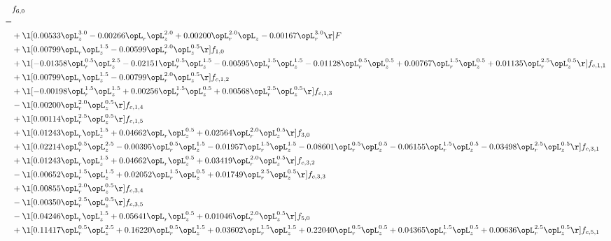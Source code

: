 \begin{alignat}{2} 
\label{eq:f_60_1} 
& f_{6,0} \nonumber \\ 
 = \\ 
& + \l[  0.00533 \opL_z^{3.0}   -0.00266 \opL_r \opL_z^{2.0} +  0.00200 \opL_r^{2.0} \opL_z   -0.00167 \opL_r^{3.0}  \r] F \nonumber \\ 
& + \l[  0.00799 \opL_r \opL_z^{1.5}   -0.00599 \opL_r^{2.0} \opL_z^{0.5}  \r] f_{1,0} \nonumber \\ 
& + \l[  -0.01358 \opL_r^{0.5} \opL_z^{2.5}   -0.02151 \opL_r^{0.5} \opL_z^{1.5}   -0.00595 \opL_r^{1.5} \opL_z^{1.5}   -0.01128 \opL_r^{0.5} \opL_z^{0.5} +  0.00767 \opL_r^{1.5} \opL_z^{0.5} +  0.01135 \opL_r^{2.5} \opL_z^{0.5}  \r] f_{c,1,1} \nonumber \\ 
& + \l[  0.00799 \opL_r \opL_z^{1.5}   -0.00799 \opL_r^{2.0} \opL_z^{0.5}  \r] f_{c,1,2} \nonumber \\ 
& + \l[  -0.00198 \opL_r^{1.5} \opL_z^{1.5} +  0.00256 \opL_r^{1.5} \opL_z^{0.5} +  0.00568 \opL_r^{2.5} \opL_z^{0.5}  \r] f_{c,1,3} \nonumber \\ 
& - \l[  0.00200 \opL_r^{2.0} \opL_z^{0.5}  \r] f_{c,1,4} \nonumber \\ 
& + \l[  0.00114 \opL_r^{2.5} \opL_z^{0.5}  \r] f_{c,1,5} \nonumber \\ 
& + \l[  0.01243 \opL_r \opL_z^{1.5} +  0.04662 \opL_r \opL_z^{0.5} +  0.02564 \opL_r^{2.0} \opL_z^{0.5}  \r] f_{3,0} \nonumber \\ 
& + \l[  0.02214 \opL_r^{0.5} \opL_z^{2.5}   -0.00395 \opL_r^{0.5} \opL_z^{1.5}   -0.01957 \opL_r^{1.5} \opL_z^{1.5}   -0.08601 \opL_r^{0.5} \opL_z^{0.5}   -0.06155 \opL_r^{1.5} \opL_z^{0.5}   -0.03498 \opL_r^{2.5} \opL_z^{0.5}  \r] f_{c,3,1} \nonumber \\ 
& + \l[  0.01243 \opL_r \opL_z^{1.5} +  0.04662 \opL_r \opL_z^{0.5} +  0.03419 \opL_r^{2.0} \opL_z^{0.5}  \r] f_{c,3,2} \nonumber \\ 
& - \l[  0.00652 \opL_r^{1.5} \opL_z^{1.5} +  0.02052 \opL_r^{1.5} \opL_z^{0.5} +  0.01749 \opL_r^{2.5} \opL_z^{0.5}  \r] f_{c,3,3} \nonumber \\ 
& + \l[  0.00855 \opL_r^{2.0} \opL_z^{0.5}  \r] f_{c,3,4} \nonumber \\ 
& - \l[  0.00350 \opL_r^{2.5} \opL_z^{0.5}  \r] f_{c,3,5} \nonumber \\ 
& - \l[  0.04246 \opL_r \opL_z^{1.5} +  0.05641 \opL_r \opL_z^{0.5} +  0.01046 \opL_r^{2.0} \opL_z^{0.5}  \r] f_{5,0} \nonumber \\ 
& + \l[  0.11417 \opL_r^{0.5} \opL_z^{2.5} +  0.16220 \opL_r^{0.5} \opL_z^{1.5} +  0.03602 \opL_r^{1.5} \opL_z^{1.5} +  0.22040 \opL_r^{0.5} \opL_z^{0.5} +  0.04365 \opL_r^{1.5} \opL_z^{0.5} +  0.00636 \opL_r^{2.5} \opL_z^{0.5}  \r] f_{c,5,1} \nonumber \\ 

\end{alignat}
